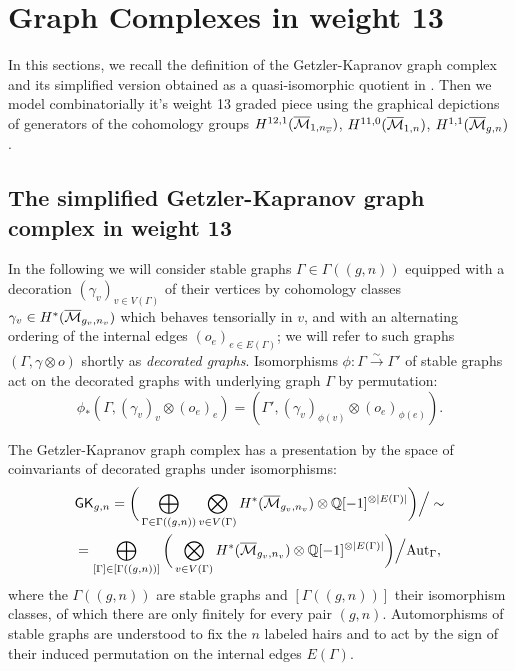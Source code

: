 

\section{Graph Complexes in weight 13}

In this sections, we recall the definition of the Getzler-Kapranov graph complex and its simplified version obtained as a quasi-isomorphic quotient in \cite{CLPW2}. Then we model combinatorially it's weight 13 graded piece using the graphical depictions of generators of the cohomology groups $H^{12,1}(\overline{\mathcal{M}}_{1,n_{\overline{v}}})$, $H^{11,0}(\overline{\mathcal{M}}_{1,n})$, $H^{1,1}(\overline{\mathcal{M}}_{g,n})$.

\subsection{The simplified Getzler-Kapranov graph complex in weight 13}
In the following we will consider stable graphs $\Gamma\in\Gamma((g,n))$ equipped with a decoration $(\gamma_v)_{v\in V(\Gamma)}$ of their vertices by cohomology classes $\gamma_v \in H^{*}(\overline{\mathcal{M}}_{g_v,n_v})$ which behaves tensorially in $v$, and with an alternating ordering of the internal edges $(o_e)_{e\in E(\Gamma)}$; we will refer to such graphs $(\Gamma,\gamma\otimes o)$ shortly as \emph{decorated graphs}. Isomorphisms $\phi:\Gamma\xrightarrow{\sim}\Gamma'$ of stable graphs act on the decorated graphs with underlying graph $\Gamma$ by permutation:
\[ \phi_* (\Gamma,(\gamma_v)_{v}\otimes (o_e)_{e}) = (\Gamma',(\gamma_v)_{\phi(v)}\otimes (o_e)_{\phi(e)}). \]

The Getzler-Kapranov graph complex has a presentation by the space of coinvariants of decorated graphs under isomorphisms:
\begin{multline}\label{equ:GKdef}
    \mathsf{GK}_{g,n} = 
    \bigg( \bigoplus_{\Gamma\in\Gamma((g,n))} \bigotimes_{v\in V(\Gamma)}H^{*}(\overline{\mathcal{M}}_{g_v,n_v})\otimes \mathbb{Q}[-1]^{\otimes |E(\Gamma)|} \bigg) \Big/ \sim \\
    = \bigoplus_{[\Gamma]\in[\Gamma((g,n))]} \bigg(
    \bigotimes_{v\in V(\Gamma)}H^{*}(\overline{\mathcal{M}}_{g_v,n_v})\otimes \mathbb{Q}[-1]^{\otimes |E(\Gamma)|} \bigg) \Big/ \text{Aut}_{\Gamma},
\end{multline}
where the $\Gamma((g,n))$ are stable graphs and $[\Gamma((g,n))]$ their isomorphism classes, of which there are only finitely for every pair $(g,n)$. Automorphisms of stable graphs are understood to fix the $n$ labeled hairs and to act by the sign of their induced permutation on the internal edges $E(\Gamma)$.

